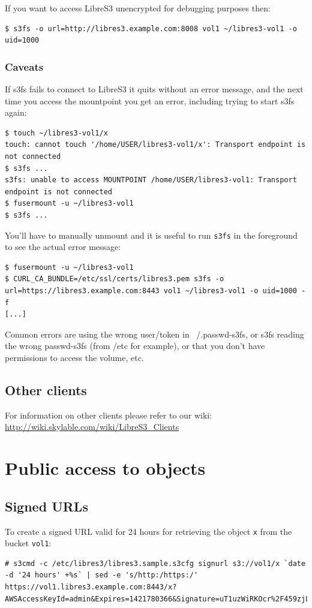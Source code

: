 If you want to access LibreS3 unencrypted for debugging purposes then:
\begin{lstlisting}
$ s3fs -o url=http://libres3.example.com:8008 vol1 ~/libres3-vol1 -o uid=1000
\end{lstlisting}

\subsection{Caveats}

If s3fs fails to connect to LibreS3 it quits without an error message,
and the next time you access the mountpoint you get an error,
including trying to start s3fs again:
\begin{lstlisting}
$ touch ~/libres3-vol1/x
touch: cannot touch '/home/USER/libres3-vol1/x': Transport endpoint is not connected
$ s3fs ...
s3fs: unable to access MOUNTPOINT /home/USER/libres3-vol1: Transport endpoint is not connected
$ fusermount -u ~/libres3-vol1
$ s3fs ...
\end{lstlisting}

You'll have to manually unmount and it is useful to run \verb|s3fs| in the
foreground to see the actual error message:
\begin{lstlisting}
$ fusermount -u ~/libres3-vol1
$ CURL_CA_BUNDLE=/etc/ssl/certs/libres3.pem s3fs -o url=https://libres3.example.com:8443 vol1 ~/libres3-vol1 -o uid=1000 -f
[...]
\end{lstlisting}

Common errors are using the wrong user/token in ~/.passwd-s3fs, or
s3fs reading the wrong passwd-s3fs (from /etc for example), or that you don't have permissions to access the volume, etc.

\section{Other clients}
For information on other clients please refer to our wiki:
\url{http://wiki.skylable.com/wiki/LibreS3_Clients}

\chapter{Public access to objects}
\section{Signed URLs}

To create a signed URL valid for 24 hours for retrieving the object \verb|x| from the bucket \verb|vol1|:
\begin{lstlisting}
# s3cmd -c /etc/libres3/libres3.sample.s3cfg signurl s3://vol1/x `date -d '24 hours' +%s` | sed -e 's/http:/https:/'
https://vol1.libres3.example.com:8443/x?AWSAccessKeyId=admin&Expires=1421780366&Signature=uT1uzWiRKOcr%2F459zjLvmWoMTSg%3D
\end{lstlisting}

